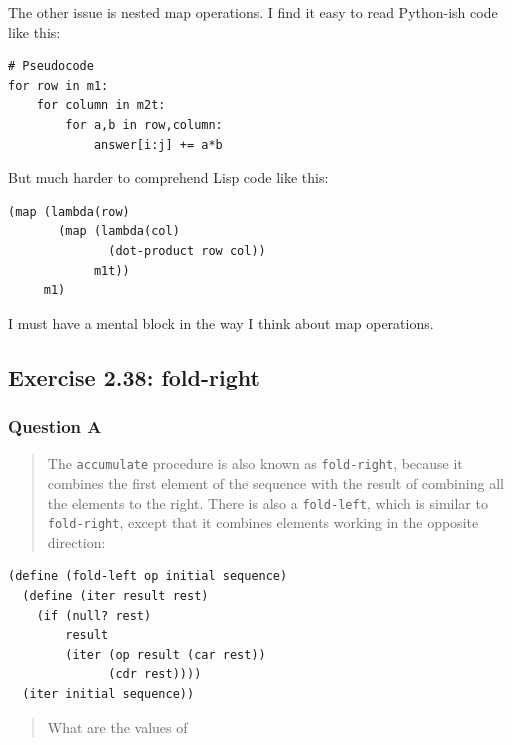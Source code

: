 \documentclass[final,fleqn,titlepage,twoside]{article}
\begin{document}
The other issue is nested map operations. I find it easy to read Python-ish
code like this:

\begin{verbatim}
# Pseudocode
for row in m1:
    for column in m2t:
        for a,b in row,column:
            answer[i:j] += a*b
\end{verbatim}

But much harder to comprehend Lisp code like this:

\begin{verbatim}
(map (lambda(row)
       (map (lambda(col)
              (dot-product row col))
            m1t))
     m1)
\end{verbatim}

I must have a mental block in the way I think about map operations.

\subsection{Exercise 2.38: fold-right}
\label{sec:org7ac7cf4}
\subsubsection{Question A}
\label{sec:org031cffb}
\begin{quote}
The \texttt{accumulate} procedure
is also known as \texttt{fold-right}, because it combines the first element of
the sequence with the result of combining all the elements to the right.  There
is also a \texttt{fold-left}, which is similar to \texttt{fold-right}, except that
it combines elements working in the opposite direction:
\end{quote}

\begin{verbatim}
(define (fold-left op initial sequence)
  (define (iter result rest)
    (if (null? rest)
        result
        (iter (op result (car rest))
              (cdr rest))))
  (iter initial sequence))
\end{verbatim}

\begin{quote}
What are the values of
\end{quote}
\end{document}
